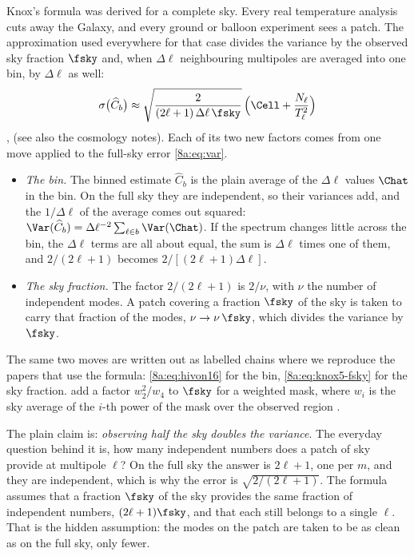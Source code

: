 Knox's formula was derived for a complete sky. Every real temperature analysis cuts away the
Galaxy, and every ground or balloon experiment sees a patch. The approximation used
everywhere for that case divides the variance by the observed sky fraction $\fsky$ and, when
$\Delta\ell$ neighbouring multipoles are averaged into one bin, by $\Delta\ell$ as well:
\begin{equation}
  \sigma\bigl(\widehat C_b\bigr)\approx\sqrt{\frac{2}{(2\ell+1)\,\Delta\ell\,\fsky}}\,
  \Bigl(\Cell+\frac{N_\ell}{T_\ell^2}\Bigr)
  \label{8a:eq:knox-fsky}
\end{equation}
, \cite[eq.~33]{Efstathiou2004} (see also the cosmology notes). Each of
its two new factors comes from one move applied to the full-sky error \eqref{8a:eq:var}.
\begin{itemize}
  \item \emph{The bin.} The binned estimate $\widehat C_b$ is the plain average of the
        $\Delta\ell$ values $\Chat$ in the bin. On the full sky they are independent, so their
        variances add, and the $1/\Delta\ell$ of the average comes out squared:
        $\Var(\widehat C_b)=\Delta\ell^{-2}\sum_{\ell\in b}\Var(\Chat)$. If the spectrum changes
        little across the bin, the $\Delta\ell$ terms are all about equal, the sum is $\Delta\ell$
        times one of them, and $2/(2\ell+1)$ becomes $2/[(2\ell+1)\Delta\ell]$.
  \item \emph{The sky fraction.} The factor $2/(2\ell+1)$ is $2/\nu$, with $\nu$ the number of
        independent modes. A patch covering a fraction $\fsky$ of the sky is taken to carry that
        fraction of the modes, $\nu\to\nu\,\fsky$, which divides the variance by $\fsky$.
\end{itemize}
The same two moves are written out as labelled chains where we reproduce the papers that use the
formula: \eqref{8a:eq:hivon16} for the bin, \eqref{8a:eq:knox5-fsky} for the sky fraction.
\textcite{Hivon2002} add a factor $w_2^2/w_4$ to $\fsky$ for a weighted mask, where
$w_i$ is the sky average of the $i$-th power of the mask over the observed region
.

The plain claim is: \emph{observing half the sky doubles the variance}. The everyday question
behind it is, how many independent numbers does a patch of sky provide at multipole $\ell$?
On the full sky the answer is $2\ell+1$, one per $m$, and they are independent, which is why
the error is $\sqrt{2/(2\ell+1)}$. The formula assumes that a fraction $\fsky$ of the sky
provides the same fraction of independent numbers, $(2\ell+1)\fsky$, and that each still
belongs to a single $\ell$. That is the hidden assumption: the modes on the patch are taken to
be as clean as on the full sky, only fewer.


